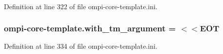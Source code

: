 Definition at line 322 of file ompi-\/core-\/template.\-ini.

\hypertarget{namespaceompi-core-template_a99715f0b797884f5eb56ad57c31d3498}{
\subsubsection[{with\-\_\-tm\-\_\-argument}]{\setlength{\rightskip}{0pt plus 5cm}ompi-\/core-\/template.\-with\-\_\-tm\-\_\-argument = $<$$<$E\-O\-T}}\label{namespaceompi-core-template_a99715f0b797884f5eb56ad57c31d3498}


Definition at line 334 of file ompi-\/core-\/template.\-ini.

